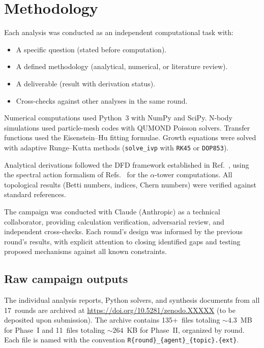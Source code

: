\documentclass[aps,prd,twocolumn,superscriptaddress,nofootinbib]{revtex4-2}
\begin{document}
\section{Methodology}
\label{sec:methodology}

Each analysis was conducted as an independent
computational task with:
\begin{itemize}
\item A specific question (stated before computation).
\item A defined methodology (analytical, numerical,
  or literature review).
\item A deliverable (result with derivation status).
\item Cross-checks against other analyses in the
  same round.
\end{itemize}

Numerical computations used Python~3 with NumPy and
SciPy. N-body simulations used particle-mesh codes
with QUMOND Poisson solvers. Transfer functions used
the Eisenstein--Hu fitting formulae. Growth equations
were solved with adaptive Runge--Kutta methods
({\tt solve\_ivp} with {\tt RK45} or {\tt DOP853}).

Analytical derivations followed the DFD framework
established in Ref.~\cite{Alcock2025}, using the
spectral action formalism of
Refs.~\cite{Chamseddine2007,ConnesChamseddine2008}
for the $\alpha$-tower computations. All topological
results (Betti numbers, indices, Chern numbers) were
verified against standard references.

The campaign was conducted with Claude (Anthropic)
as a technical collaborator, providing calculation
verification, adversarial review, and independent
cross-checks. Each round's design was informed by
the previous round's results, with explicit attention
to closing identified gaps and testing proposed
mechanisms against all known constraints.

\subsection{Raw campaign outputs}

The individual analysis reports, Python solvers, and
synthesis documents from all 17~rounds are archived at
\url{https://doi.org/10.5281/zenodo.XXXXX} (to be
deposited upon submission). The archive contains
135+~files totaling ${\sim}4.3$~MB for Phase~I and
11~files totaling ${\sim}264$~KB for Phase~II, organized
by round. Each file is named with the convention
{\tt R\{round\}\_\{agent\}\_\{topic\}.\{ext\}}.
\end{document}
